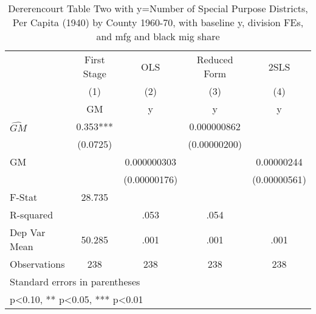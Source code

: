 \begin{table}[htbp]\centering
\def\sym#1{\ifmmode^{#1}\else\(^{#1}\)\fi}
\caption{Dererencourt Table Two with y=Number of Special Purpose Districts, Per Capita (1940) by County 1960-70, with baseline y, division FEs, and mfg and black mig share}
\begin{tabular}{l*{4}{c}}
\toprule
                    & First Stage   &         OLS   &Reduced Form   &        2SLS   \\
                    &\multicolumn{1}{c}{(1)}&\multicolumn{1}{c}{(2)}&\multicolumn{1}{c}{(3)}&\multicolumn{1}{c}{(4)}\\
                    &\multicolumn{1}{c}{GM}&\multicolumn{1}{c}{y}&\multicolumn{1}{c}{y}&\multicolumn{1}{c}{y}\\
\midrule
$\hat{GM}$          &       0.353***&               & 0.000000862   &               \\
                    &    (0.0725)   &               &(0.00000200)   &               \\
\addlinespace
GM                  &               & 0.000000303   &               &  0.00000244   \\
                    &               &(0.00000176)   &               &(0.00000561)   \\
\midrule
F-Stat              &      28.735   &               &               &               \\
R-squared           &               &        .053   &        .054   &               \\
Dep Var Mean        &      50.285   &        .001   &        .001   &        .001   \\
Observations        &         238   &         238   &         238   &         238   \\
\bottomrule
\multicolumn{5}{l}{\footnotesize Standard errors in parentheses}\\
\multicolumn{5}{l}{\footnotesize * p<0.10, ** p<0.05, *** p<0.01}\\
\end{tabular}
\end{table}
